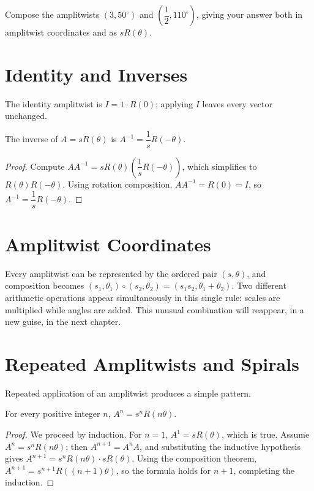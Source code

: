 \begin{practicenow}
Compose the amplitwists $(3,50^\circ)$ and $\left(\dfrac12,
110^\circ\right)$, giving your answer both in amplitwist coordinates and
as $sR(\theta)$.
\end{practicenow}

\section{Identity and Inverses}

The identity amplitwist is $I = 1\cdot R(0)$; applying $I$ leaves every
vector unchanged.

\begin{theorem}
The inverse of $A = sR(\theta)$ is $A^{-1} = \dfrac1s R(-\theta)$.
\end{theorem}

\begin{proof}
Compute $AA^{-1} = sR(\theta)\left(\dfrac1s R(-\theta)\right)$, which
simplifies to $R(\theta)R(-\theta)$. Using rotation composition,
$AA^{-1} = R(0) = I$, so $A^{-1} = \dfrac1s R(-\theta)$.
\end{proof}

\section{Amplitwist Coordinates}

Every amplitwist can be represented by the ordered pair $(s,\theta)$, and
composition becomes $(s_1,\theta_1)\circ(s_2,\theta_2) =
(s_1s_2,\theta_1+\theta_2)$. Two different arithmetic operations appear
simultaneously in this single rule: scales are multiplied while angles
are added. This unusual combination will reappear, in a new guise, in the
next chapter.

\section{Repeated Amplitwists and Spirals}

Repeated application of an amplitwist produces a simple pattern.

\begin{theorem}
For every positive integer $n$, $A^n = s^nR(n\theta)$.
\end{theorem}

\begin{proof}
We proceed by induction. For $n=1$, $A^1 = sR(\theta)$, which is true.
Assume $A^n = s^nR(n\theta)$; then $A^{n+1} = A^nA$, and substituting the
inductive hypothesis gives $A^{n+1} = s^nR(n\theta)\cdot sR(\theta)$.
Using the composition theorem, $A^{n+1} = s^{n+1}R((n+1)\theta)$, so the
formula holds for $n+1$, completing the induction.
\end{proof}

